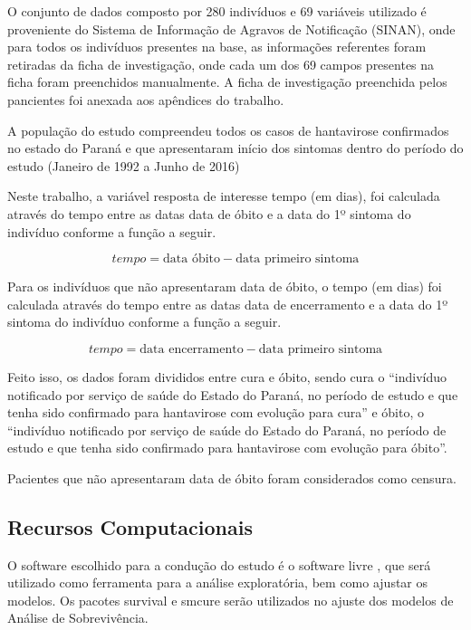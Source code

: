 \documentclass[
	12pt,				%
	openright,			%
	oneside,			%
	a4paper,			%
	brazil				%
	]{abntex2}
\begin{document}
O conjunto de dados composto por 280 indivíduos e 69 variáveis utilizado é proveniente do Sistema de Informação de Agravos de Notificação (SINAN), onde para todos os indivíduos presentes na base, as informações referentes foram retiradas da ficha de investigação, onde cada um dos 69 campos presentes na ficha foram preenchidos manualmente. A ficha de investigação preenchida pelos pancientes foi anexada aos apêndices do trabalho.

A população do estudo compreendeu todos os casos de hantavirose confirmados no estado do Paraná e que apresentaram início dos sintomas dentro do período do estudo (Janeiro de 1992 a Junho de 2016)

Neste trabalho, a variável resposta de interesse tempo (em dias), foi calculada através do tempo entre as datas data de óbito e a data do 1º sintoma do indivíduo conforme a função a seguir.

\[tempo = \text{data óbito} - \text{data primeiro sintoma}\]

Para os indivíduos que não apresentaram data de óbito, o tempo (em dias) foi calculada através do tempo entre as datas data de encerramento e a data do 1º sintoma do indivíduo conforme a função a seguir.

\[tempo = \text{data encerramento} - \text{data primeiro sintoma}\]

Feito isso, os dados foram divididos entre cura e óbito, sendo cura o ``indivíduo notificado por serviço de saúde do Estado do Paraná, no período de estudo e que tenha sido confirmado para hantavirose com evolução para cura'' e óbito, o ``indivíduo notificado por serviço de saúde do Estado do Paraná, no período de estudo e que tenha sido confirmado para hantavirose com evolução para óbito''.

Pacientes que não apresentaram data de óbito foram considerados como censura.

\newpage

\hypertarget{recursos-computacionais}{%
\subsection{Recursos Computacionais}\label{recursos-computacionais}}

O software escolhido para a condução do estudo é o software livre , que será utilizado como ferramenta para a análise exploratória, bem como ajustar os modelos.
Os pacotes survival  e smcure  serão utilizados no ajuste dos modelos de Análise de Sobrevivência.
\end{document}
